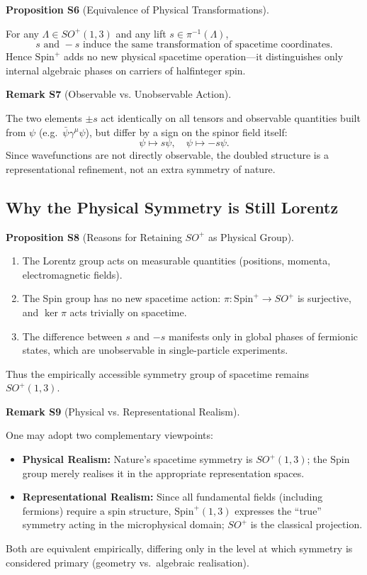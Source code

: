 \documentclass[10pt, letterpaper]{article}
\newcommand{\Spin}{\mathrm{Spin}}
\newcommand{\CustomHeading}[3]{%
  \par\medskip\noindent%
  \textbf{#1 #2} \textnormal{(#3)}.\enskip%
}
\newenvironment{PROP}[2]{\begin{unitbox}\CustomHeading{Proposition}{#1}{#2}}{\end{unitbox}}
\newenvironment{REM}[2]{\begin{unitbox}\CustomHeading{Remark}{#1}{#2}}{\end{unitbox}}
\begin{document}
\begin{PROP}{S6}{Equivalence of Physical Transformations}
For any $\Lambda\in SO^+(1,3)$ and any lift $s\in \pi^{-1}(\Lambda)$,
\[
s\text{ and }-s\text{ induce the same transformation of spacetime coordinates.}
\]
Hence $\Spin^+$ adds no new physical spacetime operation—it distinguishes only internal algebraic phases on carriers of halfinteger spin.
\end{PROP}

\begin{REM}{S7}{Observable vs. Unobservable Action}
The two elements $\pm s$ act identically on all tensors and observable quantities built from $\psi$ (e.g.\ $\bar\psi\gamma^\mu\psi$), but differ by a sign on the spinor field itself:
\[
\psi \mapsto s\psi,\quad \psi\mapsto -s\psi.
\]
Since wavefunctions are not directly observable, the doubled structure is a representational refinement, not an extra symmetry of nature.
\end{REM}

\subsection{Why the Physical Symmetry is Still Lorentz}

\begin{PROP}{S8}{Reasons for Retaining $SO^+$ as Physical Group}
\begin{enumerate}[label=\roman*)]
\item The Lorentz group acts on measurable quantities (positions, momenta, electromagnetic fields).  
\item The Spin group has no new spacetime action: $\pi:\Spin^+\to SO^+$ is surjective, and $\ker\pi$ acts trivially on spacetime.
\item The difference between $s$ and $-s$ manifests only in global phases of fermionic states, which are unobservable in single-particle experiments.
\end{enumerate}
Thus the empirically accessible symmetry group of spacetime remains $SO^+(1,3)$.
\end{PROP}

\begin{REM}{S9}{Physical vs. Representational Realism}
One may adopt two complementary viewpoints:
\begin{itemize}
\item \textbf{Physical Realism:} Nature’s spacetime symmetry is $SO^+(1,3)$; the Spin group merely realises it in the appropriate representation spaces.
\item \textbf{Representational Realism:} Since all fundamental fields (including fermions) require a spin structure, $\Spin^+(1,3)$ expresses the “true” symmetry acting in the microphysical domain; $SO^+$ is the classical projection.
\end{itemize}
Both are equivalent empirically, differing only in the level at which symmetry is considered primary (geometry vs.\ algebraic realisation).
\end{REM}
\end{document}

